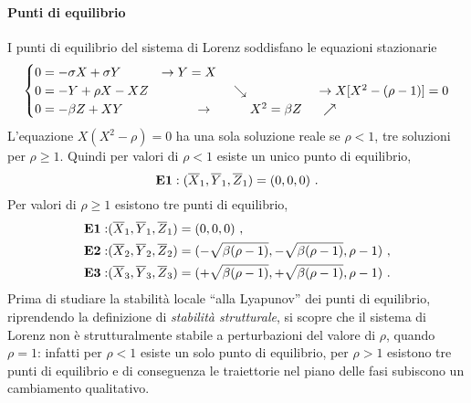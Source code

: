 \paragraph{Punti di equilibrio}
I punti di equilibrio del sistema di Lorenz soddisfano le equazioni stazionarie
\begin{equation}
    \begin{cases}
      0 = - \sigma X + \sigma Y  & \rightarrow Y = X \\
      0 = - Y + \rho X - X Z & \hspace{2.0cm} \searrow \hspace{2.0cm}\rightarrow  X[X^2-(\rho-1)] = 0 \\
      0 = - \beta Z + X Y  & \hspace{1.0cm} \rightarrow \hspace{1.0cm}  X^2 = \beta Z \hspace{0.5cm} \nearrow 
    \end{cases}
\end{equation}
L'equazione $X(X^2 - \rho) = 0$ ha una sola soluzione reale se $\rho < 1$, tre soluzioni
 per $\rho \geq 1$. Quindi per valori di $\rho < 1$ esiste un unico punto di equilibrio,
\begin{equation}
 \text{\textbf{E1}}: (\overline{X}_1, \overline{Y}_1, \overline{Z}_1) = (0,0,0) \ .
\end{equation}
Per valori di $\rho \geq 1$ esistono tre punti di equilibrio,
\begin{equation}
\begin{aligned}
 \text{\textbf{E1}}: &  (\overline{X}_1, \overline{Y}_1, \overline{Z}_1) = (0,0,0) \ , \\
 \text{\textbf{E2}}: &  (\overline{X}_2, \overline{Y}_2, \overline{Z}_2) =
 (-\sqrt{\beta(\rho-1)},-\sqrt{\beta(\rho-1)},\rho-1) \ , \\
 \text{\textbf{E3}}: &  (\overline{X}_3, \overline{Y}_3, \overline{Z}_3) =
 (+\sqrt{\beta(\rho-1)},+\sqrt{\beta(\rho-1)},\rho-1) \ .
\end{aligned}
\end{equation}
%
Prima di studiare la stabilità locale ``alla Lyapunov'' dei punti di equilibrio, riprendendo
 la definizione di \textit{stabilità strutturale}, si scopre che il sistema di Lorenz
 non è strutturalmente stabile a perturbazioni del valore di $\rho$, quando $\rho = 1$: infatti
 per $\rho < 1$ esiste un solo punto di equilibrio, per $\rho > 1$ esistono tre punti di equilibrio
 e di conseguenza le traiettorie nel piano delle fasi subiscono un cambiamento qualitativo.


